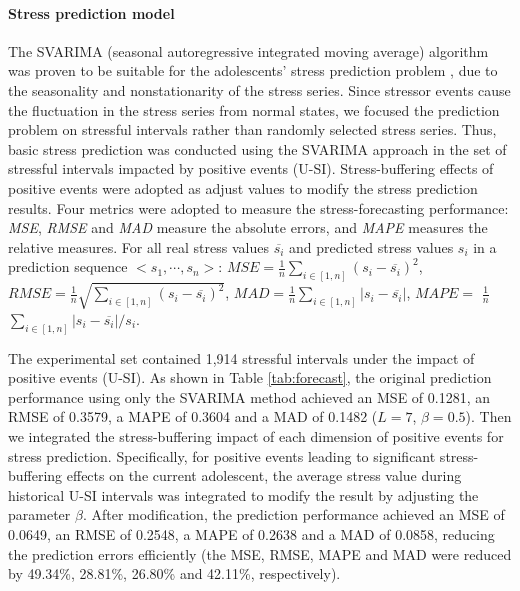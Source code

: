 \paragraph{Stress prediction model}
The SVARIMA (seasonal autoregressive integrated moving average) algorithm was proven to be suitable for the adolescents' stress prediction problem \citep{Li2015Predicting, Shumway2006Time},
due to the seasonality and nonstationarity of the stress series.
Since stressor events cause the fluctuation in the stress series from normal states,
we focused the prediction problem on stressful intervals rather than randomly selected stress series.
Thus, basic stress prediction was conducted using the SVARIMA approach in the set of stressful intervals impacted by positive events (U-SI).
Stress-buffering effects of positive events were adopted as adjust values to modify the stress prediction results.
Four metrics were adopted to measure the stress-forecasting performance:
\emph{MSE}, \emph{RMSE} and \emph{MAD} measure the absolute errors,
and \emph{MAPE} measures the relative measures.
For all real stress values $\overline{s_i}$ and predicted stress values $s_i$ in a prediction sequence $<s_1,\cdots,s_n>$:
$MSE = \frac{1}{n}\sum_{i\in[1,n]}(s_i-\overline{s_i})^2$,
$RMSE = \frac{1}{n}\sqrt{\sum_{i\in[1,n]}(s_i-\overline{s_i})^2}$,
$MAD = \frac{1}{n}\sum_{i\in[1,n]}|s_i-\overline{s_i}|$,
$MAPE = $ $\frac{1}{n}$ $\sum_{i\in[1,n]}{|s_i-\overline{s_i}|/s_i}$.

The experimental set contained 1,914 stressful intervals under the impact of positive events (U-SI).
As shown in Table \ref{tab:forecast},
the original prediction performance using only the SVARIMA method
achieved an MSE of 0.1281, an RMSE of 0.3579, a MAPE of 0.3604 and a MAD of 0.1482 ($L = 7$, $\beta = 0.5$).
Then we integrated the stress-buffering impact of each dimension of positive events for stress prediction.
Specifically, for positive events leading to significant stress-buffering effects on the current adolescent,
the average stress value during historical U-SI intervals was integrated to modify the result by adjusting the parameter $\beta$.
After modification,
the prediction performance achieved an MSE of 0.0649, an RMSE of 0.2548, a MAPE of 0.2638 and a MAD of 0.0858,
reducing the prediction errors efficiently (the MSE, RMSE, MAPE and MAD were reduced by 49.34\%, 28.81\%, 26.80\% and 42.11\%, respectively).

